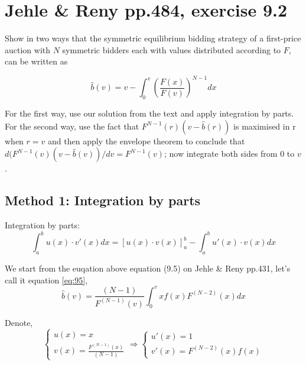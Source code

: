 \documentclass{article}
\begin{document}
\newpage

\section{Jehle \& Reny pp.484, exercise 9.2}

Show in two ways that the symmetric equilibrium bidding strategy of a first-price auction with $N$
symmetric bidders each with values distributed according to $F$, can be written as


$$\hat{b}(v) = v -\int_{0}^{v} \left(\frac{F(x)}{F(v)}\right)^{N-1} dx$$

For the first way, use our solution from the text and apply integration by parts. For the second
way, use the fact that $F^{N-1}(r)(v - \hat{b}(r))$ is maximised in r when $r = v$ and then apply the envelope
theorem to conclude that $d(F^{N-1}(v)(v - \hat{b}(v))/dv = F^{N-1}(v)$; now integrate both sides from $0$ to $v$.

\subsection*{Method 1: Integration by parts}

\begin{mdframed}[backgroundcolor=blue!20,linecolor=white]
Integration by parts: 
$$\int_a^b u(x) \cdot v'(x) dx = \left[u(x) \cdot v(x)\right]_a^b - \int_a^b u'(x) \cdot v(x) dx $$
\end{mdframed}

We start from the euqation above equation (9.5) on Jehle \& Reny pp.431, let's call it equation \ref{eq:95},
\begin{equation}
\hat{b}(v)= \frac{(N-1)}{F^{(N-1)}(v)} \int_0^{v}xf(x)F^{(N-2)}(x)dx
\label{eq:95}   
\end{equation}

Denote,
\begin{equation}
    \begin{cases}
u(x)=x  \\
v(x)= \frac{F^{(N-1)}(x)}{(N-1)}
    \end{cases}
\Rightarrow
	\begin{cases}
 u'(x)= 1 \\
 v'(x)= F^{(N-2)}(x)f(x)
	\end{cases}
\nonumber
\end{equation}
\end{document}
